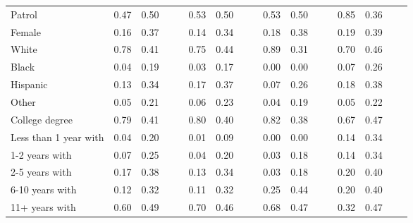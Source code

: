 \begin{sidewaystable}[htbp]
\begin{tabular}{l*{4}{cccc}}
Patrol          &     0.47&     0.50&         &         &     0.53&     0.50&         &         &     0.53&     0.50&         &         &     0.85&     0.36&         &         \\
Female          &     0.16&     0.37&         &         &     0.14&     0.34&         &         &     0.18&     0.38&         &         &     0.19&     0.39&         &         \\
White           &     0.78&     0.41&         &         &     0.75&     0.44&         &         &     0.89&     0.31&         &         &     0.70&     0.46&         &         \\
Black           &     0.04&     0.19&         &         &     0.03&     0.17&         &         &     0.00&     0.00&         &         &     0.07&     0.26&         &         \\
Hispanic        &     0.13&     0.34&         &         &     0.17&     0.37&         &         &     0.07&     0.26&         &         &     0.18&     0.38&         &         \\
Other           &     0.05&     0.21&         &         &     0.06&     0.23&         &         &     0.04&     0.19&         &         &     0.05&     0.22&         &         \\
College degree  &     0.79&     0.41&         &         &     0.80&     0.40&         &         &     0.82&     0.38&         &         &     0.67&     0.47&         &         \\
Less than 1 year with&     0.04&     0.20&         &         &     0.01&     0.09&         &         &     0.00&     0.00&         &         &     0.14&     0.34&         &         \\
1-2 years with  &     0.07&     0.25&         &         &     0.04&     0.20&         &         &     0.03&     0.18&         &         &     0.14&     0.34&         &         \\
2-5 years with  &     0.17&     0.38&         &         &     0.13&     0.34&         &         &     0.03&     0.18&         &         &     0.20&     0.40&         &         \\
6-10 years with &     0.12&     0.32&         &         &     0.11&     0.32&         &         &     0.25&     0.44&         &         &     0.20&     0.40&         &         \\
11+ years with  &     0.60&     0.49&         &         &     0.70&     0.46&         &         &     0.68&     0.47&         &         &     0.32&     0.47&         &         \\
\hline\hline
\end{tabular}
\end{sidewaystable}
